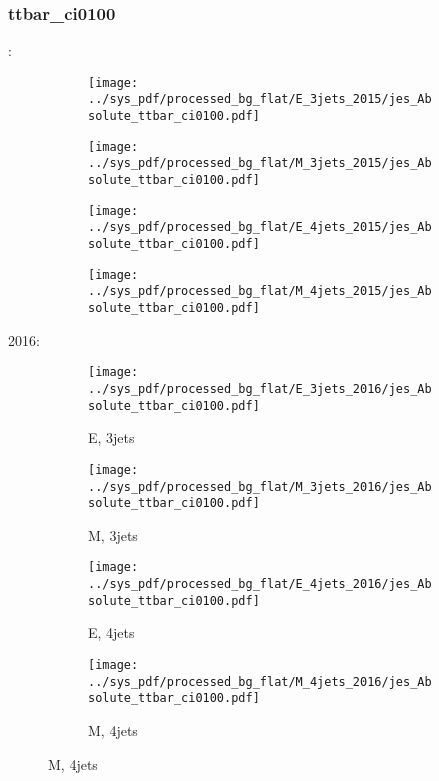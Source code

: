 \documentclass{beamer}
\begin{document}
\begin{frame}
\frametitle{ttbar_ci0100}
\fontsize{5}{1}:
\begin{figure}
\centering
\begin{subfigure}[b]{0.24\textwidth}
\texttt{[image: ../sys\_pdf/processed\_bg\_flat/E\_3jets\_2015/jes\_Absolute\_ttbar\_ci0100.pdf]}
\end{subfigure}
\begin{subfigure}[b]{0.24\textwidth}
\texttt{[image: ../sys\_pdf/processed\_bg\_flat/M\_3jets\_2015/jes\_Absolute\_ttbar\_ci0100.pdf]}
\end{subfigure}
\begin{subfigure}[b]{0.24\textwidth}
\texttt{[image: ../sys\_pdf/processed\_bg\_flat/E\_4jets\_2015/jes\_Absolute\_ttbar\_ci0100.pdf]}
\end{subfigure}
\begin{subfigure}[b]{0.24\textwidth}
\texttt{[image: ../sys\_pdf/processed\_bg\_flat/M\_4jets\_2015/jes\_Absolute\_ttbar\_ci0100.pdf]}
\end{subfigure}
\end{figure}
2016:
\begin{figure}
\centering
\begin{subfigure}[b]{0.24\textwidth}
\texttt{[image: ../sys\_pdf/processed\_bg\_flat/E\_3jets\_2016/jes\_Absolute\_ttbar\_ci0100.pdf]}
\captionsetup{font=tiny}
\caption{E, 3jets}
\end{subfigure}
\begin{subfigure}[b]{0.24\textwidth}
\texttt{[image: ../sys\_pdf/processed\_bg\_flat/M\_3jets\_2016/jes\_Absolute\_ttbar\_ci0100.pdf]}
\captionsetup{font=tiny}
\caption{M, 3jets}
\end{subfigure}
\begin{subfigure}[b]{0.24\textwidth}
\texttt{[image: ../sys\_pdf/processed\_bg\_flat/E\_4jets\_2016/jes\_Absolute\_ttbar\_ci0100.pdf]}
\captionsetup{font=tiny}
\caption{E, 4jets}
\end{subfigure}
\begin{subfigure}[b]{0.24\textwidth}
\texttt{[image: ../sys\_pdf/processed\_bg\_flat/M\_4jets\_2016/jes\_Absolute\_ttbar\_ci0100.pdf]}
\captionsetup{font=tiny}
\caption{M, 4jets}
\end{subfigure}
\end{figure}
\end{frame}
\end{document}
